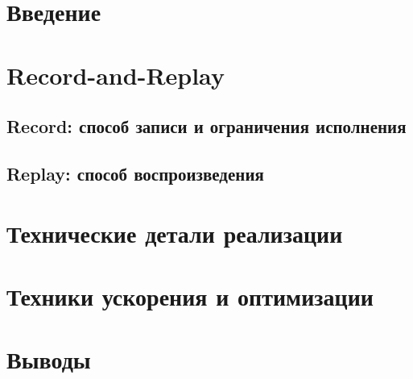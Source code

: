 



\maketitle
\sloppy

\section{Введение}


\section{Record-and-Replay}

\subsection{Record: способ записи и ограничения исполнения}


\subsection{Replay: способ воспроизведения}


\section{Технические детали реализации}


\section{Техники ускорения и оптимизации}


\section{Выводы}


{}


